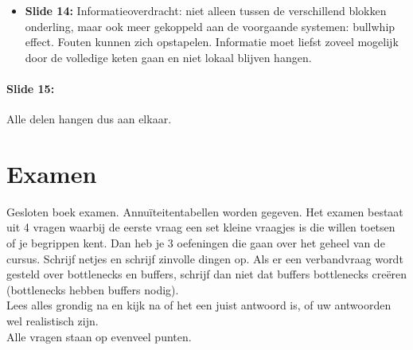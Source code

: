 \documentclass[10pt,a4paper]{report}
\begin{document}
\begin{itemize}
\begin{itemize}
\begin{itemize}
\begin{itemize}
\begin{figure}[h!]
\centering
\texttt{[image: Les22\_06.png]}
\caption{Les 22, Slideset 16, Slide 13 (3)} 
\label{les22_06}
\end{figure}
	
\end{itemize}	
			
\item multimodaal: alles met vrachtwagen, of met boten?
\item kostenstructuur en de tijden: het kan zijn dat je zegt dat je met de vrachtgen rijdt. Afhankelijk van de afstand krijg je een lineaire kost. Je kan ook gebruik maken van een boot, waarbij je eerst een stuk rijdt met de vrachtwagen en dan een transfer doet (van vrachtwagen naarboot), dan krijg je een afstand waarvan de kost lager is en dan terug een overslag en dan terug uw vrachtwagen die verder rijdt. Afhankelijk van de afstand en de kostenstructuur kan het zijn dat je combinaties maakt of alleen maar 1 transportmedium gebruikt. Zie Figuur \ref{les22_07}.

\begin{figure}[h!]
\centering
\texttt{[image: Les22\_07.png]}
\caption{Les 22, Slideset 16 Slide 13 (4)} 
\label{les22_07}
\end{figure}
			
\end{itemize}
\item Je krijgt zo een ganse reeks problemen.
\end{itemize}
\item \textbf{Slide 14:} Informatieoverdracht: niet alleen tussen de verschillend blokken onderling, maar ook meer gekoppeld aan de voorgaande systemen: bullwhip effect. Fouten kunnen zich opstapelen. Informatie moet liefst zoveel mogelijk door de volledige keten gaan en niet lokaal blijven hangen.
\end{itemize}

\paragraph{Slide 15:} Alle delen hangen dus aan elkaar. 

\section{Examen} Gesloten boek examen. Annu\"iteitentabellen worden gegeven. Het examen bestaat uit 4 vragen waarbij de eerste vraag een set kleine vraagjes is die willen toetsen of je begrippen kent. Dan heb je 3 oefeningen die gaan over het geheel van de cursus. Schrijf netjes en schrijf zinvolle dingen op. Als er een verbandvraag wordt gesteld over bottlenecks en buffers, schrijf dan niet dat buffers bottlenecks cre\"eren (bottlenecks hebben buffers nodig).\\
Lees alles grondig na en kijk na of het een juist antwoord is, of uw antwoorden wel realistisch zijn. \\
Alle vragen staan op evenveel punten.
\end{document}
